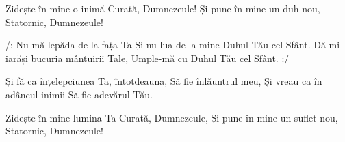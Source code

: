 \beginverse
Zidește în mine o inimă
Curată, Dumnezeule!
Și pune în mine un duh nou,
Statornic, Dumnezeule!
\endverse

\beginchorus
/: Nu mă lepăda de la fața Ta
Și nu lua de la mine Duhul Tău cel Sfânt.
Dă-mi iarăși bucuria mântuirii Tale,
Umple-mă cu Duhul Tău cel Sfânt. :/
\endchorus

\beginverse
Și fă ca înțelepciunea Ta, întotdeauna,
Să fie înlăuntrul meu,
Și vreau ca în adâncul inimii
Să fie adevărul Tău.
\endverse

\beginverse
Zidește în mine lumina Ta
Curată, Dumnezeule,
Și pune în mine un suflet nou,
Statornic, Dumnezeule!
\endverse
\endsong